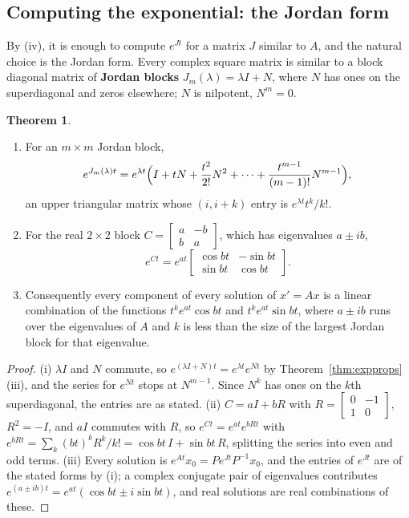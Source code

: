 \documentclass[11pt,a4paper]{article}
\numberwithin{equation}{section}
\theoremstyle{definition}
\newtheorem{thm}{Theorem}[subsection]
\begin{document}
\subsection{Computing the exponential: the Jordan form}
\label{ssec:jordan}

By (iv), it is enough to compute $e^{Jt}$ for a matrix $J$ similar to $A$, and the natural choice is the Jordan form. Every complex square matrix is similar to a block
diagonal matrix of \textbf{Jordan blocks} $J_m(\lambda) = \lambda I + N$, where $N$ has ones on the superdiagonal and zeros elsewhere; $N$ is nilpotent, $N^m = 0$.

\begin{thm}
\label{thm:jordanexp}
\begin{enumerate}[label=(\roman*)]
\item For an $m \times m$ Jordan block,
\[
e^{J_m(\lambda)t} = e^{\lambda t}\Bigl(I + tN + \frac{t^2}{2!}N^2 + \dots + \frac{t^{m-1}}{(m - 1)!}N^{m-1}\Bigr),
\]
an upper triangular matrix whose $(i, i + k)$ entry is $e^{\lambda t}t^k/k!$.
\item For the real $2 \times 2$ block $C = \begin{bmatrix} a & -b\\ b & a\end{bmatrix}$, which has eigenvalues $a \pm ib$,
\[
e^{Ct} = e^{at}\begin{bmatrix} \cos bt & -\sin bt\\ \sin bt & \cos bt\end{bmatrix} .
\]
\item Consequently every component of every solution of $x' = Ax$ is a linear combination of the functions $t^ke^{at}\cos bt$ and $t^ke^{at}\sin bt$, where $a \pm ib$ runs over the eigenvalues
of $A$ and $k$ is less than the size of the largest Jordan block for that eigenvalue.
\end{enumerate}
\end{thm}

\begin{proof}
(i) $\lambda I$ and $N$ commute, so $e^{(\lambda I + N)t} = e^{\lambda t}e^{Nt}$ by Theorem~\ref{thm:expprops}(iii), and the series for $e^{Nt}$ stops at $N^{m-1}$. Since $N^k$ has ones on the $k$th superdiagonal, the entries
are as stated. (ii) $C = aI + bR$ with $R = \begin{bmatrix} 0 & -1\\ 1 & 0\end{bmatrix}$, $R^2 = -I$, and $aI$ commutes with $R$, so $e^{Ct} = e^{at}e^{bRt}$ with $e^{bRt} = \sum_k(bt)^kR^k/k! = \cos bt\,I + \sin bt\,R$, splitting
the series into even and odd terms. (iii) Every solution is $e^{At}x_0 = Pe^{Jt}P^{-1}x_0$, and the entries of $e^{Jt}$ are of the stated forms by (i); a complex conjugate pair of eigenvalues
contributes $e^{(a \pm ib)t} = e^{at}(\cos bt \pm i\sin bt)$, and real solutions are real combinations of these.
\end{proof}
\end{document}
